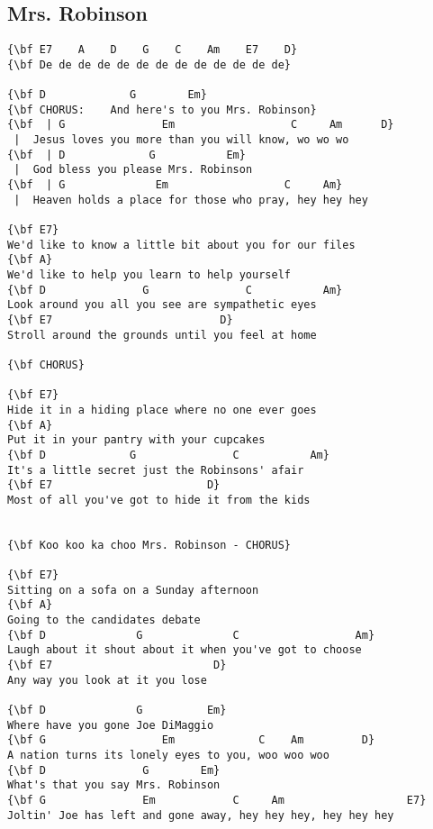 \documentclass[a4paper]{article}
\begin{document}
\subsection{Mrs. Robinson} %
\label{sub:Mrs. Robinso}
\begin{Verbatim}[commandchars=\\\{\}]
{\bf E7    A    D    G    C    Am    E7    D}
{\bf De de de de de de de de de de de de de}

{\bf D             G        Em}
{\bf CHORUS:	And here's to you Mrs. Robinson}
{\bf  |	G               Em                  C     Am      D}
 |	Jesus loves you more than you will know, wo wo wo
{\bf  |	D             G           Em}
 |	God bless you please Mrs. Robinson
{\bf  |	G              Em                  C     Am}
 |	Heaven holds a place for those who pray, hey hey hey

{\bf E7}
We'd like to know a little bit about you for our files
{\bf A}
We'd like to help you learn to help yourself
{\bf D               G               C           Am}
Look around you all you see are sympathetic eyes
{\bf E7                          D}
Stroll around the grounds until you feel at home

{\bf CHORUS}

{\bf E7}
Hide it in a hiding place where no one ever goes
{\bf A}
Put it in your pantry with your cupcakes
{\bf D             G               C           Am}
It's a little secret just the Robinsons' afair
{\bf E7                        D}
Most of all you've got to hide it from the kids


{\bf Koo koo ka choo Mrs. Robinson - CHORUS}

{\bf E7}
Sitting on a sofa on a Sunday afternoon
{\bf A}
Going to the candidates debate
{\bf D              G              C                  Am}
Laugh about it shout about it when you've got to choose
{\bf E7                         D}
Any way you look at it you lose

{\bf D              G          Em}
Where have you gone Joe DiMaggio
{\bf G                  Em             C    Am         D}
A nation turns its lonely eyes to you, woo woo woo
{\bf D               G        Em}
What's that you say Mrs. Robinson
{\bf G               Em            C     Am                   E7}
Joltin' Joe has left and gone away, hey hey hey, hey hey hey
\end{Verbatim}
\newpage
\end{document}
